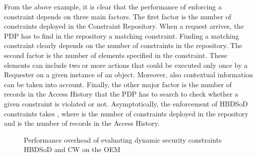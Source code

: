 \documentclass[epsfig,a4paper,11pt,titlepage]{book}
\numberwithin{algorithm}{chapter}
\begin{document}
From the above example, it is clear that the performance of enforcing a constraint depends on three main factors. The first factor is the number of constraints deployed in the Constraint Repository. When a request arrives, the \gls{PDP} has to find in the repository a matching constraint. Finding a matching constraint clearly depends on the number of constraints in the repository. The second factor is the number of elements specified in the constraint. These elements can include two or more actions that could be executed only once by a Requester on a given instance of an object. Moreover, also contextual information can be taken into account. Finally, the other major factor is the number of records in the Access History that the \gls{PDP} has to search to check whether a given constraint is violated or not. Asymptotically, the enforcement of \gls{HBDSoD} constraints takes , where  is the number of constraints deployed in the repository and  is the number of records in the Access History.


\begin{figure}[htp]
\centering
{}
\caption[Performance overhead of evaluating dynamic security constraints]{Performance overhead of evaluating dynamic security constraints  \gls{HBDSoD} and  \gls{CW} on the \gls{OEM}}
\label{fig:egrant-constraint-evaluation}
\end{figure}
\end{document}
